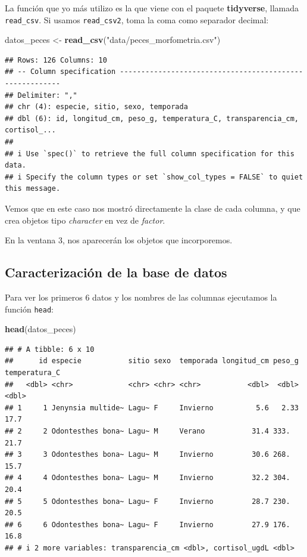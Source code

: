 \documentclass[
]{article}
\newenvironment{Shaded}{\begin{snugshade}}{\end{snugshade}}
\newcommand{\FunctionTok}[1]{\textcolor[rgb]{0.13,0.29,0.53}{\textbf{#1}}}
\newcommand{\NormalTok}[1]{#1}
\newcommand{\OtherTok}[1]{\textcolor[rgb]{0.56,0.35,0.01}{#1}}
\newcommand{\StringTok}[1]{\textcolor[rgb]{0.31,0.60,0.02}{#1}}
\begin{document}
La función que yo más utilizo es la que viene con el paquete
\textbf{tidyverse}, llamada \texttt{read\_csv}. Si usamos
\texttt{read\_csv2}, toma la coma como separador decimal:

\begin{Shaded}
\begin{Highlighting}[]
\NormalTok{datos\_peces }\OtherTok{\textless{}{-}} \FunctionTok{read\_csv}\NormalTok{(}\StringTok{"data/peces\_morfometria.csv"}\NormalTok{)}
\end{Highlighting}
\end{Shaded}

\begin{verbatim}
## Rows: 126 Columns: 10
## -- Column specification --------------------------------------------------------
## Delimiter: ","
## chr (4): especie, sitio, sexo, temporada
## dbl (6): id, longitud_cm, peso_g, temperatura_C, transparencia_cm, cortisol_...
## 
## i Use `spec()` to retrieve the full column specification for this data.
## i Specify the column types or set `show_col_types = FALSE` to quiet this message.
\end{verbatim}

Vemos que en este caso nos mostró directamente la clase de cada columna,
y que crea objetos tipo \emph{character} en vez de \emph{factor}.

En la ventana 3, nos aparecerán los objetos que incorporemos.

\subsection{Caracterización de la base de
datos}\label{caracterizaciuxf3n-de-la-base-de-datos}

Para ver los primeros 6 datos y los nombres de las columnas ejecutamos
la función \texttt{head}:

\begin{Shaded}
\begin{Highlighting}[]
\FunctionTok{head}\NormalTok{(datos\_peces)}
\end{Highlighting}
\end{Shaded}

\begin{verbatim}
## # A tibble: 6 x 10
##      id especie           sitio sexo  temporada longitud_cm peso_g temperatura_C
##   <dbl> <chr>             <chr> <chr> <chr>           <dbl>  <dbl>         <dbl>
## 1     1 Jenynsia multide~ Lagu~ F     Invierno          5.6   2.33          17.7
## 2     2 Odontesthes bona~ Lagu~ M     Verano           31.4 333.            21.7
## 3     3 Odontesthes bona~ Lagu~ M     Invierno         30.6 268.            15.7
## 4     4 Odontesthes bona~ Lagu~ M     Invierno         32.2 304.            20.4
## 5     5 Odontesthes bona~ Lagu~ F     Invierno         28.7 230.            20.5
## 6     6 Odontesthes bona~ Lagu~ F     Invierno         27.9 176.            16.8
## # i 2 more variables: transparencia_cm <dbl>, cortisol_ugdL <dbl>
\end{verbatim}
\end{document}

